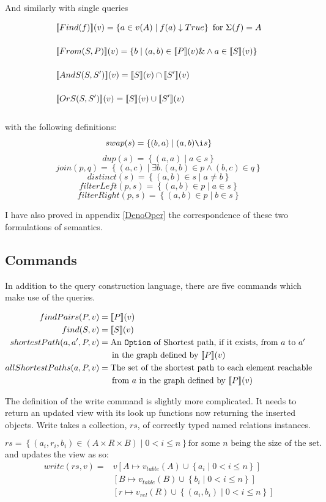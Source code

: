\documentclass[12pt,a4paper,twoside,openright]{report}
\newcommand\codeName[1]{\texttt{#1}}
\newcommand{\db}[1]{{\bf [\![}#1{\bf ]\!]}}
\newcommand{\deno}[1]{\db{#1}(v)}
\newcommand{\setComp}[2]{\left\lbrace #1 \mid #2 \right\rbrace}
\begin{document}
And similarly with single queries

\begin{align}
&\deno{Find(f)} = \setComp{a \in v(A)}{f(a)\downarrow True} \mbox{ for $\Sigma(f) = A$} \\[3ex]
&\deno{From(S, P)} =  \setComp{b}{(a, b) \in \deno{P} \&\wedge a \in \deno{S}}   \\[3ex]
&\deno{AndS(S, S')} = \deno{S} \cap \deno{S'} \\[3ex]
&\deno{OrS(S, S')} = \deno{S} \cup \deno{S'} \\[3ex]
\end{align}
with the following definitions:
\[ swap(s) = \setComp{(b,a)}{(a, b) \i s}\]
\[ dup(s) = \setComp{(a,a)}{a \in s}\]
\[ join(p, q) = \setComp{(a, c)}{ \exists b. (a, b) \in p \wedge (b, c) \in q}\]
\[ distinct(s) = \setComp{(a, b) \in s} { a \neq b} \]
\[ filterLeft(p, s) = \setComp{(a, b) \in p}{a \in s}\]
\[ filterRight(p, s) = \setComp{(a, b) \in p}{b \in s}\]
    
   I have also proved in appendix \ref{DenoOper} the correspondence of these two formulations of semantics.
\subsection{Commands}
In addition to the query construction language, there are five commands which make use of the queries.

\[\label{CommandSemantics}
\begin{split}
findPairs(P, v) &= \deno{P}\\
find(S, v) &=  \deno{S}\\
shortestPath(a, a', P, v) &= \mbox{An \codeName{Option} of Shortest path, if it exists, from $a$ to $a'$}\\
& \indent \mbox{in the graph defined by $\deno{P}$}\\
allShortestPaths(a, P, v) &= \mbox{The set of the shortest path to each element reachable}\\
 & \indent \mbox{from $a$ in the graph defined by $\deno{P}$}\\
\end{split}\]

The definition of the write command is slightly more complicated. It needs to return an updated view with its look up functions now returning the inserted objects. Write takes a collection, $rs$, of correctly typed named relations instances.


\[rs = \setComp{(a_i, r_i, b_i) \in (A \times R \times B)}{0 < i \leqslant n} \mbox{for some $n$ being the size of the set.}\]
and updates the view as so: 
\begin{equation}
\begin{split}
write(rs, v) = &v\left[A \mapsto v_{table}(A) \cup \setComp{a_i}{0 < i \leqslant n}\right]\\
& \left[B \mapsto v_{table}(B) \cup \setComp{b_i}{0 < i \leqslant n}\right]\\
& \left[r \mapsto v_{rel}(R) \cup \setComp{(a_i, b_i)}{0 < i \leqslant n}\right] 
\end{split}
\end{equation}
\end{document}
